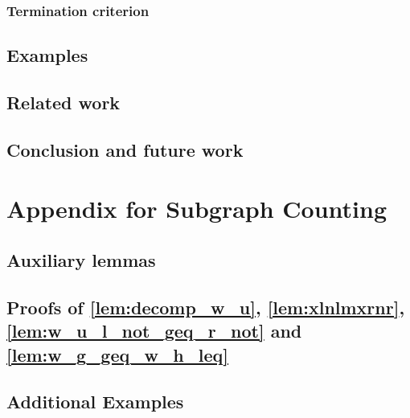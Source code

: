 \documentclass{book}
\begin{document}
\subsection{Termination criterion}
\label{sec:termination} 

 

\section{Examples}
\label{sec:examples}


  
\section{Related work}
\label{sec:related_work} 


\section{Conclusion and future work}
\label{sec:conclusion} 


% 
% 

\chapter{Appendix for Subgraph Counting}
% 
\section*{Auxiliary lemmas}

\section{Proofs of \autoref{lem:decomp_w_u}, \autoref{lem:xlnlmxrnr}, \autoref{lem:w_u_l_not_geq_r_not} and \autoref{lem:w_g_geq_w_h_leq}}
\label{sec:appendix:a}

\section{Additional Examples}

 

\printbibliography
\end{document}
